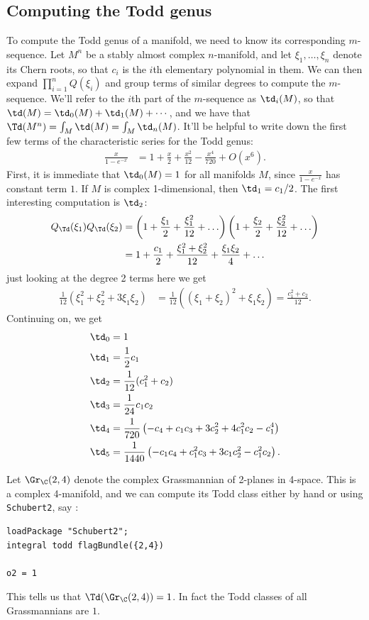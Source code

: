\documentclass[11pt]{book}
\begin{document}
\subsection{Computing the Todd genus}
To compute the Todd genus of a manifold, we need to know its corresponding $m$-sequence. Let $M^n$ be a stably almost complex $n$-manifold, and let $\xi_1, \ldots, \xi_n$ denote its Chern roots, so that $c_i$ is the $i$th elementary polynomial in them. We can then expand $\prod_{i=1}^n Q(\xi_i)$ and group terms of similar degrees to compute the $m$-sequence. We'll refer to the $i$th part of the $m$-sequence as $\td_i(M)$, so that $\td(M) = \td_0(M) + \td_1(M) + \cdots$, and we have that $\Td(M^n) = \int_M \td(M) = \int_M \td_n(M)$. It'll be helpful to write down the first few terms of the characteristic series for the Todd genus:
\begin{align*}
    \frac{x}{1-e^{-x}} &= 1 + \frac{x}{2} + \frac{x^2}{12} - \frac{x^4}{720} + O(x^6).
\end{align*}
First, it is immediate that $\td_0(M) = 1$ for all manifolds $M$, since $\frac{x}{1-e^{-x}}$ has constant term $1$. If $M$ is complex 1-dimensional, then $\td_1 = c_1/2$. The first interesting computation is $\td_2$:
\begin{align*}
    Q_\Td(\xi_1)Q_\Td(\xi_2) &= \left( 1 + \frac{\xi_1}{2} + \frac{\xi_1^2}{12} + \ldots  \right)\left( 1 + \frac{\xi_2}{2} + \frac{\xi_2^2}{12} + \ldots  \right)\\
    &= 1 + \frac{c_1}{2} + \frac{\xi_1^2 + \xi_2^2}{12} + \frac{\xi_1 \xi_2}{4} + \ldots
\end{align*}
just looking at the degree 2 terms here we get
\begin{align*}
    \frac{1}{12} \left( \xi_1^2 + \xi_2^2 + 3\xi_1 \xi_2 \right) &= \frac{1}{12} \left( (\xi_1 + \xi_2)^2  + \xi_1 \xi_2 \right) = \frac{c_1^2 + c_2}{12}.
\end{align*}
Continuing on, we get
\begin{align*}
    \td_0 &= 1\\
    \td_1 &= \frac{1}{2}c_1 \\
    \td_2 &= \frac{1}{12}(c_1^2+c_2) \\
    \td_3 &= \frac{1}{24}c_1c_2 \\
    \td_4 &= \frac{1}{720} \left( -c_4 + c_1 c_3 + 3c_2^2 + 4c_1^2c_2 - c_1^4 \right) \\
    \td_5 &= \frac{1}{1440} \left( -c_1c_4 + c_1^2c_3 + 3c_1 c_2^2 - c_1^2 c_2 \right).
\end{align*}
%
\begin{example} Let $\Gr_\C(2,4)$ denote the complex Grassmannian of 2-planes in 4-space. This is a complex 4-manifold, and we can compute its Todd class either by hand or using \texttt{Schubert2}, say \cite{Schubert2Source}:
\begin{verbatim}
loadPackage "Schubert2";
integral todd flagBundle({2,4})

o2 = 1
\end{verbatim}
This tells us that $\Td(\Gr_\C(2,4)) = 1$. In fact the Todd classes of all Grassmannians are $1$.
\end{example}
\end{document}
